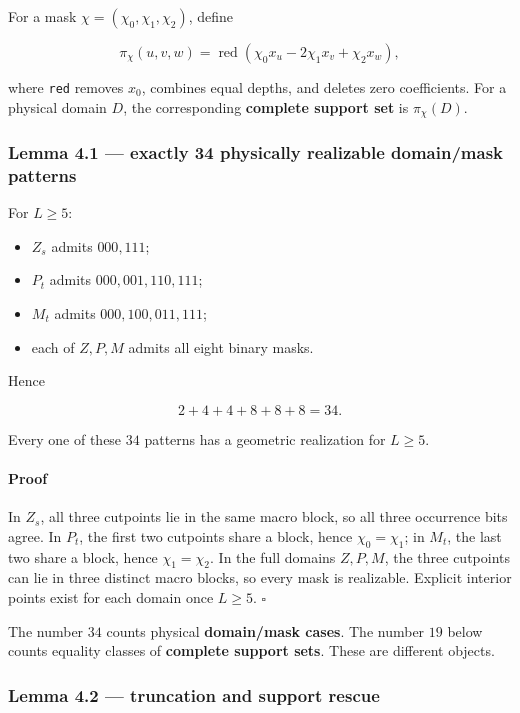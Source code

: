 \documentclass[
  british,
  a4paper,
  11pt]{article}
\providecommand{\tightlist}{%
  \setlength{\itemsep}{0pt}\setlength{\parskip}{0pt}}
\begin{document}
For a mask \(\chi=(\chi_0,\chi_1,\chi_2)\), define

\[
\pi_\chi(u,v,w)
=
\operatorname{red}
\left(
\chi_0x_u-2\chi_1x_v+\chi_2x_w
\right),
\tag{4.1}
\]

where \texttt{red} removes \(x_0\), combines equal depths, and deletes
zero coefficients. For a physical domain \(D\), the corresponding
\textbf{complete support set} is \(\pi_\chi(D)\).

\subsubsection{Lemma 4.1 --- exactly 34 physically realizable
domain/mask
patterns}\label{lemma-4.1-exactly-34-physically-realizable-domainmask-patterns}

For \(L\ge5\):

\begin{itemize}
\tightlist
\item
  \(Z_s\) admits \(000,111\);
\item
  \(P_t\) admits \(000,001,110,111\);
\item
  \(M_t\) admits \(000,100,011,111\);
\item
  each of \(Z,P,M\) admits all eight binary masks.
\end{itemize}

Hence

\[
2+4+4+8+8+8=34.
\tag{4.2}
\]

Every one of these \(34\) patterns has a geometric realization for
\(L\ge5\).

\paragraph{Proof}\label{proof-2}

In \(Z_s\), all three cutpoints lie in the same macro block, so all
three occurrence bits agree. In \(P_t\), the first two cutpoints share a
block, hence \(\chi_0=\chi_1\); in \(M_t\), the last two share a block,
hence \(\chi_1=\chi_2\). In the full domains \(Z,P,M\), the three
cutpoints can lie in three distinct macro blocks, so every mask is
realizable. Explicit interior points exist for each domain once
\(L\ge5\). \(\square\)

The number \(34\) counts physical \textbf{domain/mask cases}. The number
\(19\) below counts equality classes of \textbf{complete support sets}.
These are different objects.

\subsubsection{Lemma 4.2 --- truncation and support
rescue}\label{lemma-4.2-truncation-and-support-rescue}
\end{document}
